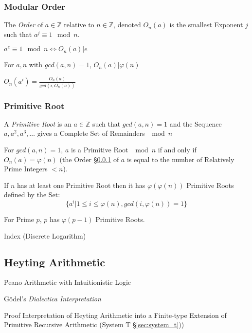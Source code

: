 \subsubsection{Modular Order}\label{sec:modular_order}

The \emph{Order} of $a \in \mathbb{Z}$ relative to $n \in \mathbb{Z}$,
denoted $O_n(a)$ is the smallest Exponent $j$ such that $a^j \equiv 1
\mod n$.

$a^e \equiv 1 \mod n \Leftrightarrow O_n(a) | e$

For $a, n$ with $gcd(a,n) = 1$, $O_n(a) | \varphi(n)$

$O_n(a^i) = \frac{O_n(a)}{gcd(i,O_n(a))}$



\subsubsection{Primitive Root}\label{sec:primitive_root}

A \emph{Primitive Root} is an $a \in \mathbb{Z}$ such that $gcd(a,n) =
1$ and the Sequence $a, a^2, a^3, \ldots$ gives a Complete Set of
Remainders $\mod n$

For $gcd(a,n) = 1$, $a$ is a Primitive Root $\mod n$ if and only if
$O_n(a) = \varphi(n)$ (the Order \S\ref{sec:modular_order} of $a$ is
equal to the number of Relatively Prime Integers $< n$).

If $n$ has at least one Primitive Root then it has
$\varphi(\varphi(n))$ Primitive Roots defined by the Set:
\[
  \{ a^i | 1 \leq i \leq \varphi(n), gcd(i,\varphi(n)) = 1 \}
\]

For Prime $p$, $p$ has $\varphi(p-1)$ Primitive Roots.

Index (Discrete Logarithm) %



\subsection{Heyting Arithmetic}\label{sec:heyting_arithmetic}

Peano Arithmetic with Intuitionistic Logic

G\"odel's \emph{Dialectica Interpretation}

Proof Interpretation of Heyting Arithmetic into a Finite-type
Extension of Primitive Recursive Arithmetic
(System T \S\ref{sec:system_t}))



